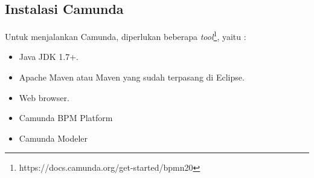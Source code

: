 \subsection{Instalasi Camunda}
\label{hasilstudi_bpms_instalasicamunda}
Untuk menjalankan Camunda, diperlukan beberapa \textit{tool}\footnote{https://docs.camunda.org/get-started/bpmn20}, yaitu :
\begin{itemize}
	\item Java JDK 1.7+.
	\item Apache Maven atau Maven yang sudah terpasang di Eclipse.
	\item Web browser.
	\item Camunda BPM Platform 
	\item Camunda Modeler
\end{itemize}


